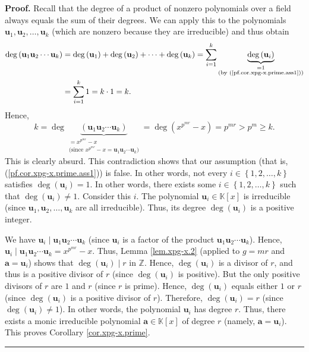 \documentclass[numbers=enddot,12pt,final,onecolumn,notitlepage]{scrartcl}%
\theoremstyle{definition}
\newenvironment{proof}[1][Proof]{\noindent\textbf{#1.} }{\ \rule{0.5em}{0.5em}}
\let\sumnonlimits\sum
\renewcommand{\sum}{\sumnonlimits\limits}
\begin{document}
\begin{proof}
Recall that the degree of a product of nonzero polynomials over a field always
equals the sum of their degrees. We can apply this to the polynomials
$\mathbf{u}_{1},\mathbf{u}_{2},\ldots,\mathbf{u}_{k}$ (which are nonzero
because they are irreducible) and thus obtain%
\begin{align*}
\deg\left(  \mathbf{u}_{1}\mathbf{u}_{2}\cdots\mathbf{u}_{k}\right)   &
=\deg\left(  \mathbf{u}_{1}\right)  +\deg\left(  \mathbf{u}_{2}\right)
+\cdots+\deg\left(  \mathbf{u}_{k}\right)  =\sum_{i=1}^{k}\underbrace{\deg
\left(  \mathbf{u}_{i}\right)  }_{\substack{=1\\\text{(by
(\ref{pf.cor.xpg-x.prime.ass1}))}}}\\
&  =\sum_{i=1}^{k}1=k\cdot1=k.
\end{align*}
Hence,%
\[
k=\deg\underbrace{\left(  \mathbf{u}_{1}\mathbf{u}_{2}\cdots\mathbf{u}%
_{k}\right)  }_{\substack{=x^{p^{mr}}-x\\\text{(since }x^{p^{mr}}%
-x=\mathbf{u}_{1}\mathbf{u}_{2}\cdots\mathbf{u}_{k}\text{)}}}=\deg\left(
x^{p^{mr}}-x\right)  =p^{mr}>p^{m}\geq k.
\]
This is clearly absurd. This contradiction shows that our assumption (that is,
(\ref{pf.cor.xpg-x.prime.ass1})) is false. In other words, not every
$i\in\left\{  1,2,\ldots,k\right\}  $ satisfies $\deg\left(  \mathbf{u}%
_{i}\right)  =1$. In other words, there exists some $i\in\left\{
1,2,\ldots,k\right\}  $ such that $\deg\left(  \mathbf{u}_{i}\right)  \neq1$.
Consider this $i$. The polynomial $\mathbf{u}_{i}\in\mathbb{K}\left[
x\right]  $ is irreducible (since $\mathbf{u}_{1},\mathbf{u}_{2}%
,\ldots,\mathbf{u}_{k}$ are all irreducible). Thus, its degree $\deg\left(
\mathbf{u}_{i}\right)  $ is a positive integer.

We have $\mathbf{u}_{i}\mid\mathbf{u}_{1}\mathbf{u}_{2}\cdots\mathbf{u}_{k}$
(since $\mathbf{u}_{i}$ is a factor of the product $\mathbf{u}_{1}%
\mathbf{u}_{2}\cdots\mathbf{u}_{k}$). Hence, $\mathbf{u}_{i}\mid\mathbf{u}%
_{1}\mathbf{u}_{2}\cdots\mathbf{u}_{k}=x^{p^{mr}}-x$. Thus, Lemma
\ref{lem.xpg-x.2} (applied to $g=mr$ and $\mathbf{a}=\mathbf{u}_{i}$) shows
that $\deg\left(  \mathbf{u}_{i}\right)  \mid r$ in $\mathbb{Z}$. Hence,
$\deg\left(  \mathbf{u}_{i}\right)  $ is a divisor of $r$, and thus is a
positive divisor of $r$ (since $\deg\left(  \mathbf{u}_{i}\right)  $ is
positive). But the only positive divisors of $r$ are $1$ and $r$ (since $r$ is
prime). Hence, $\deg\left(  \mathbf{u}_{i}\right)  $ equals either $1$ or $r$
(since $\deg\left(  \mathbf{u}_{i}\right)  $ is a positive divisor of $r$).
Therefore, $\deg\left(  \mathbf{u}_{i}\right)  =r$ (since $\deg\left(
\mathbf{u}_{i}\right)  \neq1$). In other words, the polynomial $\mathbf{u}%
_{i}$ has degree $r$. Thus, there exists a monic irreducible polynomial
$\mathbf{a}\in\mathbb{K}\left[  x\right]  $ of degree $r$ (namely,
$\mathbf{a}=\mathbf{u}_{i}$). This proves Corollary \ref{cor.xpg-x.prime}.
\end{proof}
\end{document}
